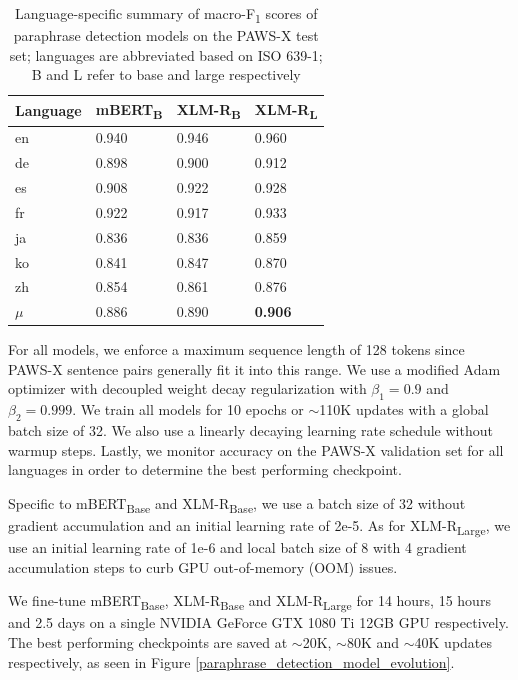 \documentclass[11pt,a4paper]{article}
\begin{document}
\begin{table}
  \centering
  \begin{tabular}{llll}
    \hline
    \textbf{Language} & \textbf{mBERT\textsubscript{B}} & \textbf{XLM-R\textsubscript{B}} & \textbf{XLM-R\textsubscript{L}} \\
    \hline
    en & 0.940 & 0.946 & 0.960 \\
    de & 0.898 & 0.900 & 0.912 \\
    es & 0.908 & 0.922 & 0.928 \\
    fr & 0.922 & 0.917 & 0.933 \\
    ja & 0.836 & 0.836 & 0.859 \\
    ko & 0.841 & 0.847 & 0.870 \\
    zh & 0.854 & 0.861 & 0.876 \\
    \hline \hline
    $\mu$ & 0.886 & 0.890 & \textbf{0.906} \\
    \hline
  \end{tabular} 
  \caption{Language-specific summary of macro-F\textsubscript{1} scores of
    paraphrase detection models on the PAWS-X test set; languages are
    abbreviated based on ISO 639-1; B and L refer to base and large
    respectively}
  \label{pawsx_score_breakdown}
\end{table}

For all models, we enforce a maximum sequence length of 128 tokens since PAWS-X
sentence pairs generally fit it into this range. We use a modified Adam
optimizer with decoupled weight decay regularization
\cite{DBLP:journals/corr/abs-1711-05101} with $\beta_1 = 0.9$ and
$\beta_2=0.999$. We train all models for 10 epochs or $\sim$110K updates with a
global batch size of 32. We also use a linearly decaying learning rate schedule
without warmup steps. Lastly, we monitor accuracy on the PAWS-X validation set
for all languages in order to determine the best performing checkpoint.

Specific to mBERT\textsubscript{Base} and XLM-R\textsubscript{Base}, we use a
batch size of 32 without gradient accumulation and an initial learning rate of
2e-5. As for XLM-R\textsubscript{Large}, we use an initial learning rate of 1e-6
and local batch size of 8 with 4 gradient accumulation steps to curb GPU
out-of-memory (OOM) issues.

We fine-tune mBERT\textsubscript{Base}, XLM-R\textsubscript{Base} and
XLM-R\textsubscript{Large} for 14 hours, 15 hours and 2.5 days on a single
NVIDIA GeForce GTX 1080 Ti 12GB GPU respectively. The best performing
checkpoints are saved at $\sim$20K, $\sim$80K and $\sim$40K updates
respectively, as seen in Figure \ref{paraphrase_detection_model_evolution}.
\end{document}
